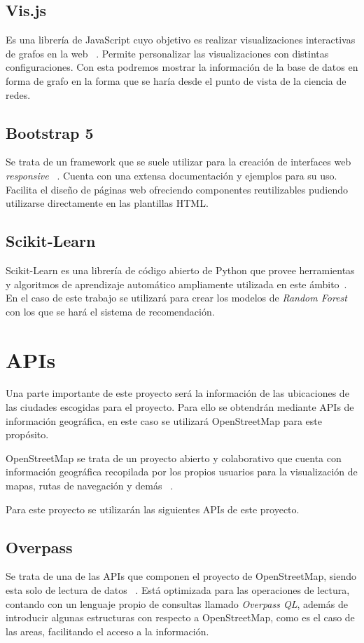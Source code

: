 \subsection{Vis.js}
Es una librería de JavaScript cuyo objetivo es realizar visualizaciones interactivas de grafos en la web ~\cite{visjsVisjs}.
Permite personalizar las visualizaciones con distintas configuraciones. Con esta podremos mostrar
la información de la base de datos en forma de grafo en la forma que se haría desde el punto de vista de la ciencia
de redes.

\subsection{Bootstrap 5}
Se trata de un framework que se suele utilizar para la creación de interfaces web \textit{responsive} ~\cite{Bootstrap}.
Cuenta con una extensa documentación y ejemplos para su uso. Facilita el diseño de páginas web ofreciendo
componentes reutilizables pudiendo utilizarse directamente en las plantillas HTML.

\subsection{Scikit-Learn}
Scikit-Learn es una librería de código abierto de Python que provee herramientas y algoritmos de aprendizaje automático ampliamente utilizada en este ámbito~\cite{scikitlearnAbout}. En el caso de este trabajo se utilizará para crear los modelos de \textit{Random Forest} con los que se hará el sistema de recomendación.


\section{APIs}
Una parte importante de este proyecto será la información de las ubicaciones de las ciudades escogidas
para el proyecto. Para ello se obtendrán mediante APIs de información geográfica, en este caso se utilizará
OpenStreetMap para este propósito. 

OpenStreetMap se trata de un proyecto abierto y colaborativo que cuenta con información geográfica
recopilada por los propios usuarios para la visualización de mapas, rutas de navegación y demás ~\cite{OSM}.

Para este proyecto se utilizarán las siguientes APIs de este proyecto. 

\subsection{Overpass}
Se trata de una de las APIs que componen el proyecto de OpenStreetMap, siendo esta solo de lectura de datos ~\cite{Overpass, openstreetmapOverpassOpenStreetMap}.
Está optimizada para las operaciones de lectura, contando con un lenguaje propio de consultas llamado \textit{Overpass QL},
además de introducir algunas estructuras con respecto a OpenStreetMap, como es el caso de las areas, facilitando el acceso a la información.

